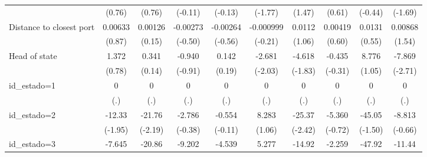 {\begin{tabular}{l*{9}{c}}
                    &      (0.76)         &      (0.76)         &     (-0.11)         &     (-0.13)         &     (-1.77)         &      (1.47)         &      (0.61)         &     (-0.44)         &     (-1.69)         \\
[1em]
Distance to closest port&     0.00633         &     0.00126         &    -0.00273         &    -0.00264         &   -0.000999         &      0.0112         &     0.00419         &      0.0131         &     0.00868         \\
                    &      (0.87)         &      (0.15)         &     (-0.50)         &     (-0.56)         &     (-0.21)         &      (1.06)         &      (0.60)         &      (0.55)         &      (1.54)         \\
[1em]
Head of state       &       1.372         &       0.341         &      -0.940         &       0.142         &      -2.681\sym{*}  &      -4.618         &      -0.435         &       8.776         &      -7.869\sym{**} \\
                    &      (0.78)         &      (0.14)         &     (-0.91)         &      (0.19)         &     (-2.03)         &     (-1.83)         &     (-0.31)         &      (1.05)         &     (-2.71)         \\
[1em]
id\_estado=1         &           0         &           0         &           0         &           0         &           0         &           0         &           0         &           0         &           0         \\
                    &         (.)         &         (.)         &         (.)         &         (.)         &         (.)         &         (.)         &         (.)         &         (.)         &         (.)         \\
[1em]
id\_estado=2         &      -12.33         &      -21.76\sym{*}  &      -2.786         &      -0.554         &       8.283         &      -25.37\sym{*}  &      -5.360         &      -45.05         &      -8.813         \\
                    &     (-1.95)         &     (-2.19)         &     (-0.38)         &     (-0.11)         &      (1.06)         &     (-2.42)         &     (-0.72)         &     (-1.50)         &     (-0.66)         \\
[1em]
id\_estado=3         &      -7.645         &      -20.86\sym{*}  &      -9.202         &      -4.539         &       5.277         &      -14.92         &      -2.259         &      -47.92         &      -11.44         \\

\end{tabular}}
